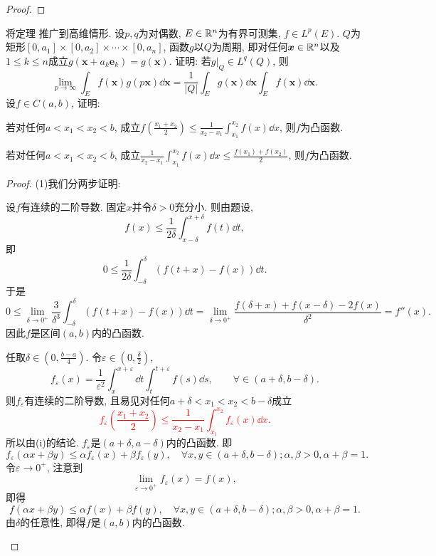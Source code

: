 \begin{quiza}
\begin{proof}
\end{proof}
\woe 将定理 推广到高维情形. 设\(p,q\)为对偶数, \(E\in\mathbb{R}^n\)为有界可测集, \(f\in L^p(E)\). \(Q\)为矩形\([0,a_1]\times [0,a_2]\times\cdots\times [0,a_n]\), 函数\(g\)以\(Q\)为周期, 即对任何\(\boldsymbol{x}\in \mathbb{R}^n\)以及\(1\leqslant k\leqslant n\)成立\(g(\boldsymbol{x}+a_k\boldsymbol{e}_k)=g(\boldsymbol{x})\). 证明: 若\(g\big|_Q\in L^q(Q)\), 则\[\lim_{p\rightarrow\infty}\int_Ef(\boldsymbol{x})g(p\boldsymbol{x})\dd\boldsymbol{x}=\frac{1}{|Q|}\int_Eg(\boldsymbol{x})\dd\boldsymbol{x}\int_Ef(\boldsymbol{x})\dd\boldsymbol{x}.\]
\woe 设\(f\in C(a,b)\), 证明:
\begin{quizs}
\item 若对任何\(a<x_1<x_2<b\), 成立\(f\left(\frac{x_1+x_2}{2}\right)\leqslant\frac{1}{x_2-x_1}\int_{x_1}^{x_2}f(x)\dd x\), 则\(f\)为凸函数.
\item 若对任何\(a<x_1<x_2<b\), 成立\(\frac{1}{x_2-x_1}\int_{x_1}^{x_2}f(x)\dd x\leqslant\frac{f(x_1)+f(x_2)}{2}\), 则\(f\)为凸函数.
\end{quizs}
\begin{proof}
(1)我们分两步证明:
\begin{asparaenum}[(i)]
\item 设\(f\)有连续的二阶导数. 固定\(x\)并令\(\delta>0\)充分小. 则由题设,\[f(x)\leqslant\frac{1}{2\delta}\int_{x-\delta}^{x+\delta}f(t)\dd t,\]即\[0\leqslant\frac{1}{2\delta}\int_{-\delta}^{\delta}\left(f(t+x)-f(x)\right)\dd t.\]于是\[0\leqslant\lim_{\delta\rightarrow 0^+}\frac{3}{\delta^3}\int_{-\delta}^{\delta}\left(f(t+x)-f(x)\right)\dd t=\lim_{\delta\rightarrow 0^+}\frac{f(\delta+x)+f(x-\delta)-2f(x)}{\delta^2}=f''(x).\]因此\(f\)是区间\((a,b)\)内的凸函数.
\item 任取\(\delta\in\left(0,\frac{b-a}{4}\right)\). 令\(\varepsilon\in\left(0,\frac{\delta}{2}\right)\),\[f_{\varepsilon}(x)=\frac{1}{\varepsilon^2}\int_{x}^{x+\varepsilon}\dd t\int_{t}^{t+\varepsilon}f(s)\dd s,\qquad \forall \in(a+\delta,b-\delta).\]则\(f_{\varepsilon}\)有连续的二阶导数, 且易见对任何\(a+\delta<x_1<x_2<b-\delta\)成立
\textcolor{red}{\[f_{\varepsilon}\left(\frac{x_1+x_2}{2}\right)\leqslant\frac{1}{x_2-x_1}\int_{x_1}^{x_2}f_{\varepsilon}(x)\dd x.\]}
所以由(i)的结论. \(f_{\varepsilon}\)是\((a+\delta,a-\delta)\)内的凸函数. 即\[f_{\varepsilon}(\alpha x+\beta y)\leqslant \alpha f_{\varepsilon}(x)+\beta f_{\varepsilon}(y),\quad\forall x,y\in(a+\delta,b-\delta);\alpha,\beta>0,\alpha+\beta=1.\]令\(\varepsilon\rightarrow 0^+\), 注意到\[\lim_{\varepsilon\rightarrow 0^+}f_{\varepsilon}(x)=f(x),\]即得\[f(\alpha x+\beta y)\leqslant \alpha f(x)+\beta f(y),\quad\forall x,y\in(a+\delta,b-\delta);\alpha,\beta>0,\alpha+\beta=1.\]由\(\delta\)的任意性, 即得\(f\)是\((a,b)\)内的凸函数.
\end{asparaenum}


\end{proof}
\end{quiza}
